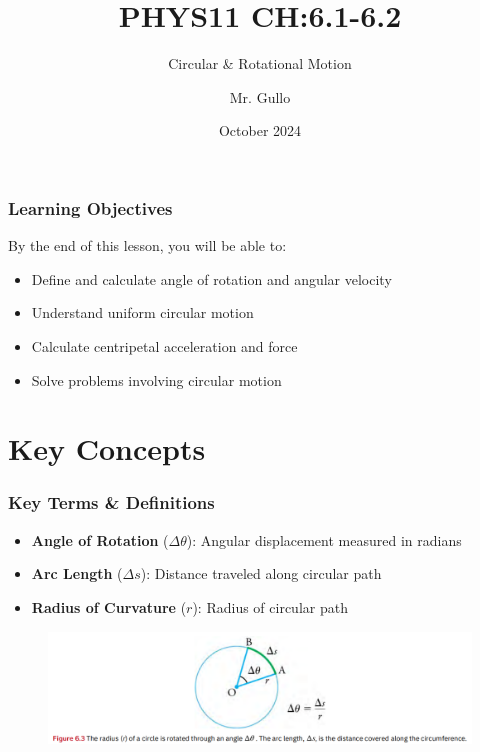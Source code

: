 \documentclass{beamer}
\title[ ]{PHYS11 CH:6.1-6.2}
\subtitle{ Circular \& Rotational Motion }
\author[Mr. Gullo]{Mr. Gullo}
\date[Oct 2024]{October 2024}
\begin{document}
\frame{\titlepage}

\begin{frame}
\frametitle{Learning Objectives}
By the end of this lesson, you will be able to:
\begin{itemize}
    \item Define and calculate angle of rotation and angular velocity
    \item Understand uniform circular motion 
    \item Calculate centripetal acceleration and force
    \item Solve problems involving circular motion
\end{itemize}


\end{frame}

\section{Key Concepts}

\begin{frame}
\frametitle{Key Terms \& Definitions}
\begin{itemize}
    \item \textbf{Angle of Rotation} ($\Delta \theta$): Angular displacement measured in radians
       \item \textbf{Arc Length} ($\Delta s$): Distance traveled along circular path
    \item \textbf{Radius of Curvature} ($r$): Radius of circular path
   
\end{itemize}

\begin{figure}[H]
    \centering
    \includegraphics[width=1\linewidth]{CH6/Screenshot 2024-11-21 125544.png}
\end{figure}

\end{frame}
\end{document}
